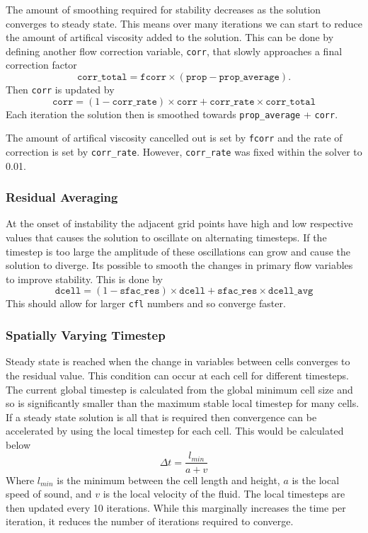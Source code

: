 \documentclass{article}
\begin{document}
The amount of smoothing required for stability decreases as the solution converges to steady state.
This means over many iterations we can start to reduce the amount of artifical viscosity added to the solution.
This can be done by defining another flow correction variable, \texttt{corr}, that slowly approaches a final correction factor
\begin{equation}
    \texttt{corr\_total} = \texttt{fcorr} \times (\texttt{prop} - \texttt{prop\_average}).
\end{equation}
Then \texttt{corr} is updated by
\begin{equation}
    \texttt{corr} = (1 - \texttt{corr\_rate}) \times \texttt{corr} + \texttt{corr\_rate} \times \texttt{corr\_total}
\end{equation}
Each iteration the solution then is smoothed towards \texttt{prop\_average} + \texttt{corr}.

The amount of artifical viscosity cancelled out is set by \texttt{fcorr} and the rate of correction is set by \texttt{corr\_rate}.
However, \texttt{corr\_rate} was fixed within the solver to 0.01.

\subsubsection{Residual Averaging}

At the onset of instability the adjacent grid points have high and low respective values that causes the solution to oscillate on alternating timesteps.
If the timestep is too large the amplitude of these oscillations can grow and cause the solution to diverge.
Its possible to smooth the changes in primary flow variables to improve stability.
This is done by
\begin{equation}
    \texttt{dcell} = (1 - \texttt{sfac\_res}) \times \texttt{dcell} + \texttt{sfac\_res} \times \texttt{dcell\_avg}
\end{equation}
This should allow for larger \texttt{cfl} numbers and so converge faster. 

\subsubsection{Spatially Varying Timestep}

Steady state is reached when the change in variables between cells converges to the residual value.
This condition can occur at each cell for different timesteps.
The current global timestep is calculated from the global minimum cell size and so is significantly smaller than the maximum stable local timestep for many cells.
If a steady state solution is all that is required then convergence can be accelerated by using the local timestep for each cell.
This would be calculated below
\begin{equation}
    \Delta t = \frac{l_{min}}{a + v}
\end{equation}
Where $l_{min}$ is the minimum between the cell length and height, $a$ is the local speed of sound, and $v$ is the local velocity of the fluid.
The local timesteps are then updated every 10 iterations.
While this marginally increases the time per iteration, it reduces the number of iterations required to converge.
\end{document}
